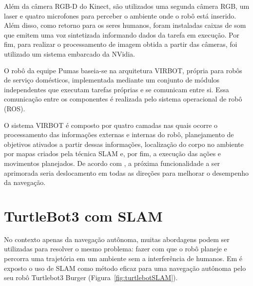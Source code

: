 Além da câmera RGB-D do Kinect, são utilizados uma segunda câmera RGB, um laser e quatro microfones para perceber o ambiente onde o robô está inserido. Além disso, como retorno para os seres humanos, foram instaladas caixas de som que emitem uma voz sintetizada informando dados da tarefa em execução. Por fim, para realizar o processamento de imagem obtida a partir das câmeras, foi utilizado um sistema embarcado da NVidia.


O robô da equipe Pumas baseia-se na arquitetura VIRBOT, própria para robôs de serviço domésticos, implementada mediante um conjunto de módulos independentes que executam tarefas próprias e se comunicam entre si. Essa comunicação entre os componentes é realizada pelo sistema operacional de robô (ROS). 

O sistema VIRBOT é composto por quatro camadas nas quais ocorre o processamento das informações externas e internas do robô,  planejamento de objetivos ativados a partir dessas informações, localização do corpo no ambiente por mapas criados pela técnica SLAM e, por fim, a execução das ações e movimentos planejados. De acordo com \citet{justina:2019}, a próxima funcionalidade a ser aprimorada seria deslocamento em todas as direções para melhorar o desempenho da navegação.

\section{TurtleBot3 com SLAM}
No contexto apenas da navegação autônoma, muitas abordagens podem ser utilizadas para resolver o mesmo problema: fazer com que o robô planeje e percorra uma trajetória em um ambiente sem a interferência de humanos. Em \citet{navegacaoSlam:2022} é exposto o uso de SLAM como método eficaz para uma navegação autônoma pelo seu robô Turtlebot3 Burger (Figura~\ref{fig:turtlebotSLAM}). 

